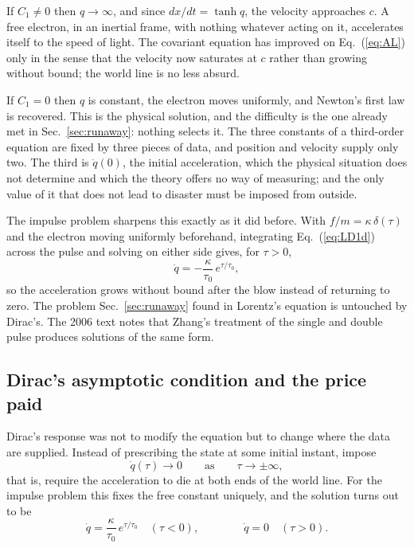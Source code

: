 \documentclass[preprint]{aastex701}
\newcommand{\taunought}{\tau_0}
\begin{document}
If $C_1\ne 0$ then $q\to\infty$, and since $dx/dt = \tanh q$, the velocity
approaches $c$. A free electron, in an inertial frame, with nothing whatever
acting on it, accelerates itself to the speed of light. The covariant equation
has improved on Eq.~(\ref{eq:AL}) only in the sense that the velocity now
saturates at $c$ rather than growing without bound; the world line is no less
absurd.

If $C_1 = 0$ then $q$ is constant, the electron moves uniformly, and Newton's
first law is recovered. This is the physical solution, and the difficulty is
the one already met in Sec.~\ref{sec:runaway}: nothing selects it. The three
constants of a third-order equation are fixed by three pieces of data, and
position and velocity supply only two. The third is $\dot q(0)$, the initial
acceleration, which the physical situation does not determine and which the
theory offers no way of measuring; and the only value of it that does not lead
to disaster must be imposed from outside.

The impulse problem sharpens this exactly as it did before. With
$f/m = \kappa\,\delta(\tau)$ and the electron moving uniformly beforehand,
integrating Eq.~(\ref{eq:LD1d}) across the pulse and solving on either side
gives, for $\tau>0$,
\begin{equation}
\dot q = -\frac{\kappa}{\taunought}\,e^{\tau/\taunought},
\label{eq:LDimpulse}
\end{equation}
so the acceleration grows without bound after the blow instead of returning to
zero. The problem Sec.~\ref{sec:runaway} found in Lorentz's equation is
untouched by Dirac's. The 2006 text notes that Zhang's treatment of the single
and double pulse \citep{zhang_zongsui} produces solutions of the same form.

\subsection{Dirac's asymptotic condition and the price paid}
\label{sec:asymptotic}



Dirac's response was not to modify the equation but to change where the data
are supplied. Instead of prescribing the state at some initial instant, impose
\begin{equation}
\dot q(\tau) \longrightarrow 0
\qquad\text{as}\qquad
\tau\to\pm\infty ,
\label{eq:asymptotic}
\end{equation}
that is, require the acceleration to die at both ends of the world line. For
the impulse problem this fixes the free constant uniquely, and the solution
turns out to be
\begin{equation}
\dot q = \frac{\kappa}{\taunought}\,e^{\tau/\taunought}
\quad (\tau<0),
\qquad\qquad
\dot q = 0 \quad (\tau>0).
\label{eq:preaccel}
\end{equation}
\end{document}
